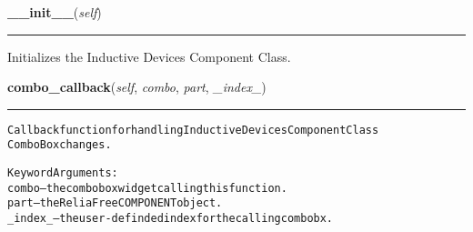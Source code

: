 \hspace{.8\funcindent}\begin{boxedminipage}{\funcwidth}

    \raggedright \textbf{\_\_init\_\_}(\textit{self})

    \vspace{-1.5ex}

    \rule{\textwidth}{0.5\fboxrule}
\setlength{\parskip}{2ex}
    Initializes the Inductive Devices Component Class.

\setlength{\parskip}{1ex}
    \end{boxedminipage}

    \label{reliafree:inductors:inductor:Inductor:combo_callback}

    \vspace{0.5ex}

\hspace{.8\funcindent}\begin{boxedminipage}{\funcwidth}

    \raggedright \textbf{combo\_callback}(\textit{self}, \textit{combo}, \textit{part}, \textit{\_index\_})

    \vspace{-1.5ex}

    \rule{\textwidth}{0.5\fboxrule}
\setlength{\parskip}{2ex}
\begin{alltt}
Callback function for handling Inductive Devices Component Class
ComboBox changes.

Keyword Arguments:
  combo -- the combobox widget calling this function.
   part -- the ReliaFree COMPONENT object.
\_index\_ -- the user-definded index for the calling combobx.
\end{alltt}

\setlength{\parskip}{1ex}
    \end{boxedminipage}

    \label{reliafree:inductors:inductor:Inductor:create_reliability_inputs}

    \vspace{0.5ex}


